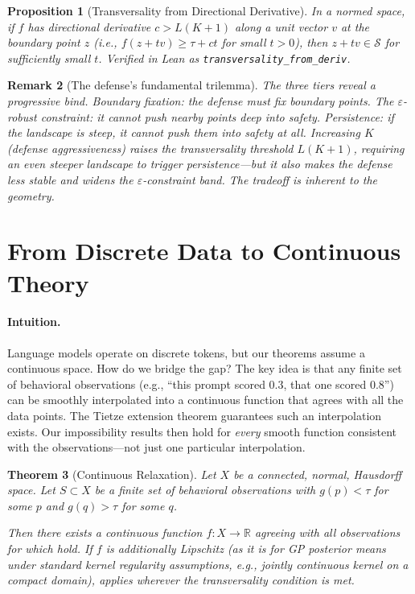 \documentclass[11pt]{article}
\newtheorem{theorem}{Theorem}[section]
\newtheorem{proposition}[theorem]{Proposition}
\newtheorem{remark}[theorem]{Remark}
\newcommand{\R}{\mathbb{R}}
\begin{document}
\begin{proposition}[Transversality from Directional Derivative]
\label{prop:transversality}
In a normed space, if $f$ has directional derivative $c > L(K+1)$
along a unit vector $v$ at the boundary point $z$ (i.e.,
$f(z + tv) \geq \tau + ct$ for small $t > 0$), then
$z + tv \in \mathcal{S}$ for sufficiently small $t$.
Verified in Lean as \texttt{transversality\_from\_deriv}.
\end{proposition}

\begin{remark}[The defense's fundamental trilemma]
The three tiers reveal a progressive bind. Boundary fixation: the
defense \emph{must} fix boundary points. The $\varepsilon$-robust
constraint: it cannot push nearby points \emph{deep} into safety.
Persistence: if the landscape is steep, it cannot push them into safety
\emph{at all}. Increasing $K$ (defense aggressiveness) raises the
transversality threshold $L(K+1)$, requiring an even steeper landscape
to trigger persistence---but it also makes the defense less stable and
widens the $\varepsilon$-constraint band. The tradeoff is inherent to
the geometry.
\end{remark}


\section{From Discrete Data to Continuous Theory}
\label{sec:bridge}

\paragraph{Intuition.}
Language models operate on discrete tokens, but our theorems assume a
continuous space. How do we bridge the gap? The key idea is that any
finite set of behavioral observations (e.g., ``this prompt scored
$0.3$, that one scored $0.8$'') can be smoothly interpolated into a
continuous function that agrees with all the data points. The Tietze
extension theorem guarantees such an interpolation exists. Our
impossibility results then hold for \emph{every} smooth function
consistent with the observations---not just one particular
interpolation.

\begin{theorem}[Continuous Relaxation]
\label{thm:tietze}
Let $X$ be a connected, normal, Hausdorff space. Let $S \subset X$ be a
finite set of behavioral observations with $g(p) < \tau$ for some $p$
and $g(q) > \tau$ for some $q$.

Then there exists a continuous function $f\colon X \to \R$ agreeing
with all observations for which  hold.
If $f$ is additionally Lipschitz (as it is for GP posterior means under
standard kernel regularity assumptions, e.g., jointly continuous kernel
on a compact domain),  applies wherever the
transversality condition is met.
\end{theorem}
\end{document}
